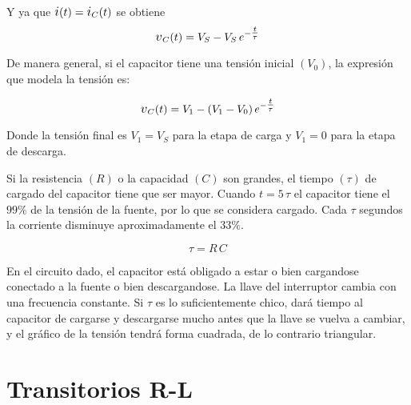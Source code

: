 Y ya que $\current(t) = \current_C(t)$ se obtiene
\begin{equation*}
    \voltage_C(t) = V_S - V_S \, e^{-\tfrac{t}{\tau}}
\end{equation*}

\begin{center}
    \def\svgwidth{0.8\linewidth}
    
\end{center}

De manera general, si el capacitor tiene una tensión inicial $(V_0)$, la expresión que modela la tensión es:

\begin{equation*}
    \voltage_C(t) = V_1 - \inParentheses{V_1 - V_0} e^{-\tfrac{t}{\tau}}
\end{equation*}

Donde la tensión final es $V_1 = V_S$ para la etapa de carga y $V_1 = 0$ para la etapa de descarga.

Si la resistencia $(R)$ o la capacidad $(C)$ son grandes, el tiempo $(\tau)$ de cargado del capacitor tiene que ser mayor.
Cuando $t = 5 \, \tau$ el capacitor tiene el $99\%$ de la tensión de la fuente, por lo que se considera cargado.
Cada $\tau$ segundos la corriente disminuye aproximadamente el $33\%$.

\begin{mdframed}[style=MyFrame1]
    \begin{defn}
    \end{defn}
    \begin{equation*}
        \tau = R \, C
    \end{equation*}
\end{mdframed}

En el circuito dado, el capacitor está obligado a estar o bien cargandose conectado a la fuente o bien descargandose.
La llave del interruptor cambia con una frecuencia constante.
Si $\tau$ es lo suficientemente chico, dará tiempo al capacitor de cargarse y descargarse mucho antes que la llave se vuelva a cambiar, y el gráfico de la tensión tendrá forma cuadrada, de lo contrario triangular.

\begin{center}
    \def\svgwidth{\linewidth}
    
\end{center}


\section{Transitorios R-L}


